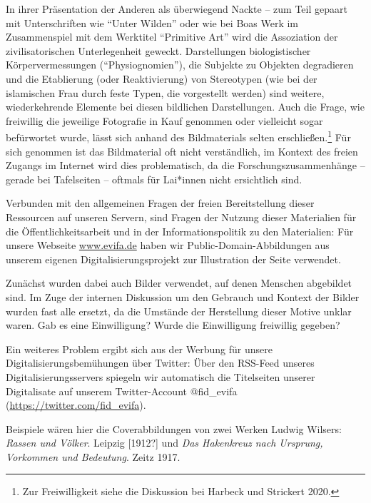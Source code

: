 \documentclass[a4paper,
fontsize=11pt,
oneside,
numbers=noperiodatend,
parskip=half-,
bibliography=totoc,
final
]{scrartcl}
\begin{document}
In ihrer Präsentation der Anderen als überwiegend Nackte -- zum Teil
gepaart mit Unterschriften wie \enquote{Unter Wilden} oder wie bei Boas
Werk im Zusammenspiel mit dem Werktitel \enquote{Primitive Art} wird die
Assoziation der zivilisatorischen Unterlegenheit geweckt. Darstellungen
biologistischer Körpervermessungen (\enquote{Physiognomien}), die
Subjekte zu Objekten degradieren und die Etablierung (oder
Reaktivierung) von Stereotypen (wie bei der islamischen Frau durch feste
Typen, die vorgestellt werden) sind weitere, wiederkehrende Elemente bei
diesen bildlichen Darstellungen. Auch die Frage, wie freiwillig die
jeweilige Fotografie in Kauf genommen oder vielleicht sogar befürwortet
wurde, lässt sich anhand des Bildmaterials selten
erschließen.\footnote{Zur Freiwilligkeit siehe die Diskussion bei
  Harbeck und Strickert 2020.} Für sich genommen ist das Bildmaterial
oft nicht verständlich, im Kontext des freien Zugangs im Internet wird
dies problematisch, da die Forschungszusammenhänge -- gerade bei
Tafelseiten -- oftmals für Lai*innen nicht ersichtlich sind.

Verbunden mit den allgemeinen Fragen der freien Bereitstellung dieser
Ressourcen auf unseren Servern, sind Fragen der Nutzung dieser
Materialien für die Öffentlichkeitsarbeit und in der Informationspolitik
zu den Materialien: Für unsere Webseite
\href{http://www.evifa.de}{www.evifa.de} haben wir
Public-Domain-Abbildungen aus unserem eigenen Digitalisierungsprojekt
zur Illustration der Seite verwendet.

Zunächst wurden dabei auch Bilder verwendet, auf denen Menschen
abgebildet sind. Im Zuge der internen Diskussion um den Gebrauch und
Kontext der Bilder wurden fast alle ersetzt, da die Umstände der
Herstellung dieser Motive unklar waren. Gab es eine Einwilligung? Wurde
die Einwilligung freiwillig gegeben?

Ein weiteres Problem ergibt sich aus der Werbung für unsere
Digitalisierungsbemühungen über Twitter: Über den RSS-Feed unseres
Digitalisierungsservers spiegeln wir automatisch die Titelseiten unserer
Digitalisate auf unserem Twitter-Account @fid\_evifa
(\url{https://twitter.com/fid_evifa}).

Beispiele wären hier die Coverabbildungen von zwei Werken Ludwig
Wilsers: \emph{Rassen und Völker}. Leipzig {[}1912?{]} und \emph{Das
Hakenkreuz nach Ursprung, Vorkommen und Bedeutung}. Zeitz 1917.
\end{document}
